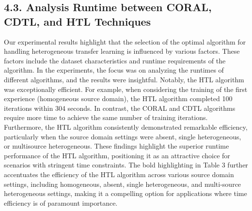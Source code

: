 \subsection{4.3.	Analysis Runtime between CORAL, CDTL, and HTL Techniques}
Our experimental results highlight that the selection of the optimal algorithm for handling heterogeneous transfer learning is influenced by various factors. These factors include the dataset characteristics and runtime requirements of the algorithm. In the experiments, the focus was on analyzing the runtimes of different algorithms, and the results were insightful. Notably, the HTL algorithm was exceptionally efficient. For example, when considering the training of the first experience (homogeneous source domain), the HTL algorithm completed 100 iterations within 304 seconds. In contrast, the CORAL and CDTL algorithms require more time to achieve the same number of training iterations. Furthermore, the HTL algorithm consistently demonstrated remarkable efficiency, particularly when the source domain settings were absent, single heterogeneous, or multisource heterogeneous. These findings highlight the superior runtime performance of the HTL algorithm, positioning it as an attractive choice for scenarios with stringent time constraints. The bold highlighting in Table 3 further accentuates the efficiency of the HTL algorithm across various source domain settings, including homogeneous, absent, single heterogeneous, and multi-source heterogeneous settings, making it a compelling option for applications where time efficiency is of paramount importance.

\begin{table}[h]
  \centering
  \caption{Runtimes (in seconds) for CORAL, CDTL, and HTL}
  \label{table:6_table3}
  \end{table}
  
